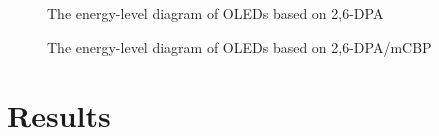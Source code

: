 \documentclass[
  letterpaper,
  DIV=11,
  numbers=noendperiod,
  oneside]{scrreprt}
\begin{document}
\begin{figure}
\begin{minipage}[b]{\linewidth}
{{}

\caption{\label{fig-dpaenergy}The energy-level diagram of OLEDs based on
2,6-DPA}

}

\end{minipage}%
\newline
\begin{minipage}[b]{\linewidth}

{\centering 


\caption{\label{fig-mcbpenergy}The energy-level diagram of OLEDs based
on 2,6-DPA/mCBP}

}

\end{minipage}%

\end{figure}

\hypertarget{results}{%
\section{Results}\label{results}}
\end{document}
